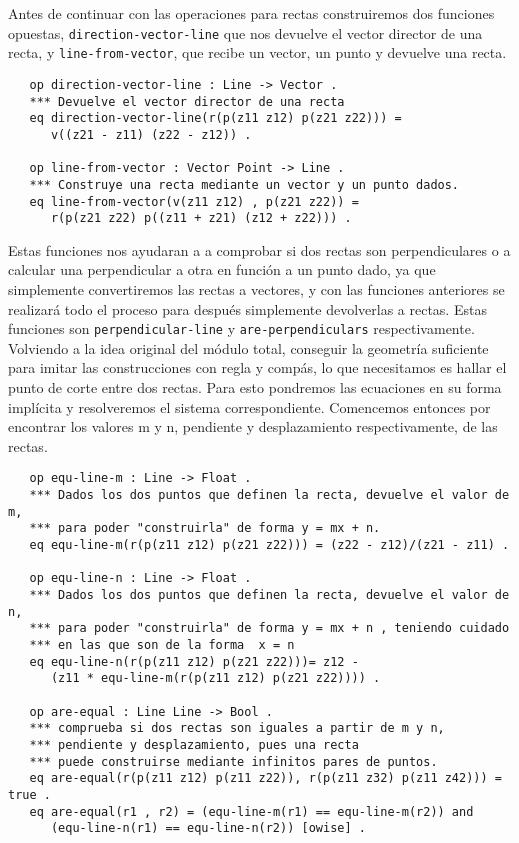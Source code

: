 Antes de continuar con las operaciones para rectas construiremos dos funciones opuestas, \texttt{direction-vector-line} que nos devuelve el vector director de una recta, y \texttt{line-from-vector}, que recibe un vector, un punto y devuelve una recta. \par
{\codesize
\begin{verbatim}
   op direction-vector-line : Line -> Vector .
   *** Devuelve el vector director de una recta
   eq direction-vector-line(r(p(z11 z12) p(z21 z22))) =
      v((z21 - z11) (z22 - z12)) .

   op line-from-vector : Vector Point -> Line .
   *** Construye una recta mediante un vector y un punto dados.
   eq line-from-vector(v(z11 z12) , p(z21 z22)) =
      r(p(z21 z22) p((z11 + z21) (z12 + z22))) .
\end{verbatim}
}

Estas funciones nos ayudaran a a comprobar si dos rectas son perpendiculares o a calcular una perpendicular a otra en función a un punto dado, ya que simplemente convertiremos las rectas a vectores, y con las funciones anteriores se realizará todo el proceso para después simplemente devolverlas a rectas. Estas funciones son \texttt{perpendicular-line} y \texttt{are-perpendiculars} respectivamente. Volviendo a la idea original del módulo total, conseguir la geometría suficiente para imitar las construcciones con regla y compás, lo que necesitamos es hallar el punto de corte entre dos rectas. Para esto pondremos las ecuaciones en su forma implícita y resolveremos el sistema correspondiente. Comencemos entonces por encontrar los valores m y n, pendiente y desplazamiento respectivamente, de las rectas. \par

{\codesize
\begin{verbatim}
   op equ-line-m : Line -> Float .
   *** Dados los dos puntos que definen la recta, devuelve el valor de m, 
   *** para poder "construirla" de forma y = mx + n.
   eq equ-line-m(r(p(z11 z12) p(z21 z22))) = (z22 - z12)/(z21 - z11) .

   op equ-line-n : Line -> Float .
   *** Dados los dos puntos que definen la recta, devuelve el valor de n, 
   *** para poder "construirla" de forma y = mx + n , teniendo cuidado 
   *** en las que son de la forma  x = n
   eq equ-line-n(r(p(z11 z12) p(z21 z22)))= z12 - 
      (z11 * equ-line-m(r(p(z11 z12) p(z21 z22)))) .

   op are-equal : Line Line -> Bool .
   *** comprueba si dos rectas son iguales a partir de m y n, 
   *** pendiente y desplazamiento, pues una recta
   *** puede construirse mediante infinitos pares de puntos.
   eq are-equal(r(p(z11 z12) p(z11 z22)), r(p(z11 z32) p(z11 z42))) = true . 
   eq are-equal(r1 , r2) = (equ-line-m(r1) == equ-line-m(r2)) and 
      (equ-line-n(r1) == equ-line-n(r2)) [owise] .
\end{verbatim}
}

